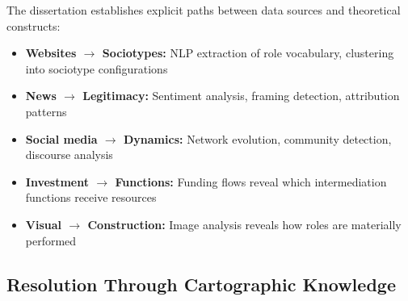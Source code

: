 \documentclass[../main.tex]{subfiles}
\begin{document}
\begin{center}
\end{center}

The dissertation establishes explicit paths between data sources and theoretical constructs:

\begin{itemize}[leftmargin=*, itemsep=0.3em]
\item \textbf{Websites $\rightarrow$ Sociotypes:} NLP extraction of role vocabulary, clustering into sociotype configurations
\item \textbf{News $\rightarrow$ Legitimacy:} Sentiment analysis, framing detection, attribution patterns
\item \textbf{Social media $\rightarrow$ Dynamics:} Network evolution, community detection, discourse analysis
\item \textbf{Investment $\rightarrow$ Functions:} Funding flows reveal which intermediation functions receive resources
\item \textbf{Visual $\rightarrow$ Construction:} Image analysis reveals how roles are materially performed
\end{itemize}

\subsection{Resolution Through Cartographic Knowledge}
\end{document}
